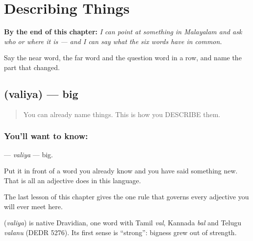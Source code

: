 
\chapter{Describing Things}
\label{ch:ml-describing-things}

\begin{chapteropening}
\textbf{By the end of this chapter:} \emph{I can point at something in Malayalam and ask who or where it is — and I can say what the six words have in common.}

Say the near word, the far word and the question word in a row, and name the part that changed.
\end{chapteropening}

\section[\texorpdfstring{\ml{വലിയ} (valiya)}{വലിയ (valiya)}]{ (valiya) — big}

\label{lesson:ML-C42-big}



\begin{quote}
You can already name things. This is how you DESCRIBE them.
\end{quote}

\subsection*{You'll want to know: }
\textbf{} — \emph{valiya} — big.

Put it in front of a word you already know and you have said something new. That is all an adjective does in this language.

The last lesson of this chapter gives the one rule that governs every adjective you will ever meet here.

\begin{cousinweb}
\textbf{} (\emph{valiya}) is native Dravidian, one word with Tamil \emph{val}, Kannada \emph{bal} and Telugu \emph{valanu} (DEDR 5276). Its first sense is \textquotedblleft{}strong\textquotedblright{}: bigness grew out of strength.
\end{cousinweb}


